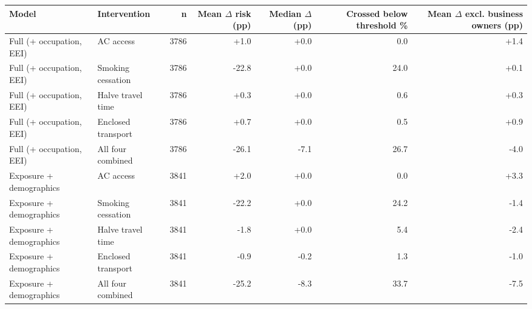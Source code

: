 \begin{tabular}{llrrrrr}
\toprule
Model & Intervention & n & Mean $\Delta$ risk (pp) & Median $\Delta$ (pp) & Crossed below threshold \% & Mean $\Delta$ excl. business owners (pp) \\
\midrule
Full (+ occupation, EEI) & AC access & 3786 & +1.0 & +0.0 & 0.0 & +1.4 \\
Full (+ occupation, EEI) & Smoking cessation & 3786 & -22.8 & +0.0 & 24.0 & +0.1 \\
Full (+ occupation, EEI) & Halve travel time & 3786 & +0.3 & +0.0 & 0.6 & +0.3 \\
Full (+ occupation, EEI) & Enclosed transport & 3786 & +0.7 & +0.0 & 0.5 & +0.9 \\
Full (+ occupation, EEI) & All four combined & 3786 & -26.1 & -7.1 & 26.7 & -4.0 \\
\midrule
Exposure + demographics & AC access & 3841 & +2.0 & +0.0 & 0.0 & +3.3 \\
Exposure + demographics & Smoking cessation & 3841 & -22.2 & +0.0 & 24.2 & -1.4 \\
Exposure + demographics & Halve travel time & 3841 & -1.8 & +0.0 & 5.4 & -2.4 \\
Exposure + demographics & Enclosed transport & 3841 & -0.9 & -0.2 & 1.3 & -1.0 \\
Exposure + demographics & All four combined & 3841 & -25.2 & -8.3 & 33.7 & -7.5 \\
\bottomrule
\end{tabular}
